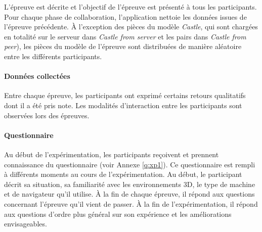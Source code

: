 L'épreuve est décrite et l'objectif de l'épreuve est présenté à tous les participants.
Pour chaque phase de collaboration, l'application nettoie les données issues de 
l'épreuve précédente. 
À l'exception des pièces du modèle \textit{Castle}, qui sont chargées
en totalité sur le serveur dans \textit{Castle from server} et les pairs dans 
\textit{Castle from peer}), les pièces du modèle de l'épreuve 
sont distribuées de manière aléatoire entre les différents participants.

\paragraph{Données collectées}
Entre chaque épreuve, les 
participants ont exprimé certains retours qualitatifs dont il a été pris note. Les modalités d'interaction entre les participants sont observées lors des épreuves.

\paragraph{Questionnaire}
Au début de l'expérimentation, les participants reçoivent et prennent connaissance 
du questionnaire (voir Annexe \ref{q:xp1}). Ce questionnaire est rempli à différents 
moments au cours de l'expérimentation. Au début, le participant décrit sa situation, 
sa familiarité avec les environnements \gls{3D}, le type de machine et de 
navigateur qu'il utilise. À la fin de chaque épreuve, il répond aux questions concernant 
l'épreuve qu'il vient de passer. À la fin de l'expérimentation, il répond aux 
questions d'ordre plus général sur son expérience et les améliorations 
envisageables.
